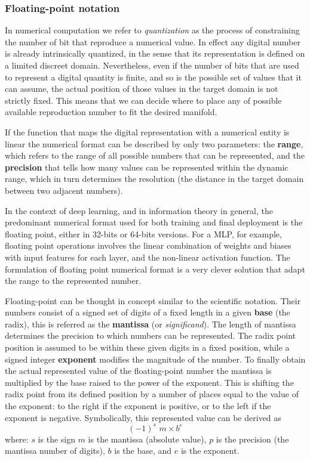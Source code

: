 \subsubsection*{Floating-point notation}

In numerical computation we refer to \textit{quantization} as the process of constraining the number of bit that reproduce a numerical value. In effect any digital number is already intrinsically quantized, in the sense that its representation is defined on a limited discreet domain. 
Nevertheless, even if the number of bits that are used to represent a digital quantity is finite, and so is the possible set of values that it can assume, the actual position of those values in the target domain is not strictly fixed. This means that we can decide where to place any of possible available reproduction number to fit the desired manifold.

If the function that maps the digital representation with a numerical entity is linear the numerical format can be described by only two parameters: the \textbf{range}, which refers to the range of all possible numbers that can be represented, and the \textbf{precision} that tells how many values can be represented within the dynamic range, which in turn determines the resolution (the distance in the target domain between two adjacent numbers).

In the context of deep learning, and in information theory in general, the predominant numerical format used for both training and final deployment is the floating point, either in 32-bits or 64-bits versions. For a \acs{MLP}, for example, floating point operations involves the linear combination of weights and biases with input features for each layer, and the non-linear activation function. The formulation of floating point numerical format is a very clever solution that adapt the range to the represented number.

Floating-point can be thought in concept similar to the scientific notation. Their numbers consist of a signed set of digits of a fixed length in a given \textbf{base} (the radix), this is referred as the \textbf{mantissa} (or \textit{significand}). The length of mantissa determines the precision to which numbers can be represented. The radix point position is assumed to be within these given digits in a fixed position, while a signed integer \textbf{exponent} modifies the magnitude of the number.
To finally obtain the actual represented value of the floating-point number the mantissa is multiplied by the base raised to the power of the exponent. This is shifting the radix point from its defined position by a number of places equal to the value of the exponent: to the right if the exponent is positive, or to the left if the exponent is negative.
Symbolically, this represented value can be derived as 
%
$$ (-1)^s \,\, m \times b^e $$
%
where: $s$ is the sign $m$ is the mantissa (absolute value), $p$ is the precision (the mantissa number of digits), $b$ is the base, and $e$ is the exponent.

